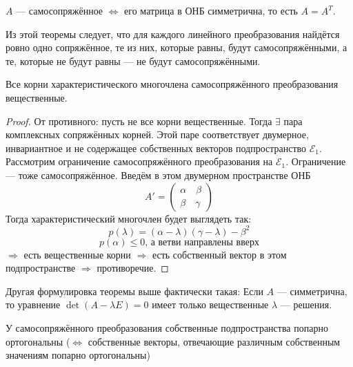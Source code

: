 \documentclass[11pt]{article}
\begin{document}
\begin{theorem} $A$ --- самосопряжённое $\Leftrightarrow$ его матрица в ОНБ симметрична, то есть $A = A^T$. 
\end{theorem}

\begin{remark}
    Из этой теоремы следует, что для каждого линейного преобразования найдётся ровно одно сопряжённое, те из них, которые равны, будут самосопряжёнными, а те, которые не будут равны --- не будут самосопряжёнными.
\end{remark}

\begin{theorem}
    Все корни характеристического многочлена самосопряжённого преобразования вещественные. 
\end{theorem}

\begin{proof}
    От противного: пусть не все корни вещественные. Тогда $ \exists $ пара комплексных сопряжённых корней. 
    Этой паре соответствует двумерное, инвариантное и не содержащее собственных векторов подпространство $\mathcal{E}_1$.
    Рассмотрим ограничение самосопряжённого преобразования на $\mathcal{E}_1$. 
    Ограничение --- тоже самосопряжённое. Введём в этом двумерном пространстве ОНБ 
    \[ A' = 
    \begin{pmatrix}
        \alpha \quad \beta \\
        \beta \quad \gamma
    \end{pmatrix} \]
    Тогда характеристический многочлен будет выглядеть так:
    \[ p(\lambda) = (\alpha - \lambda)(\gamma-\lambda) - \beta^2 \]
    \[ p(\alpha) \le 0 \text{, а ветви направлены вверх} \] 
    $\Rightarrow$ есть вещественные корни $\Rightarrow$ есть собственный вектор в этом подпространстве $\Rightarrow$ противоречие.
\end{proof}

\begin{remark}
    Другая формулировка теоремы выше фактически такая: Если $A$ --- симметрична, то уравнение $\det(A-\lambda E) = 0$ имеет только вещественные $\lambda$ --- решения.
\end{remark}

\begin{theorem}
    У самосопряжённого преобразования собственные подпространства попарно ортогональны 
    ($\Leftrightarrow$ собственные векторы, отвечающие различным собственным значениям попарно ортогональны)
\end{theorem}
\end{document}
